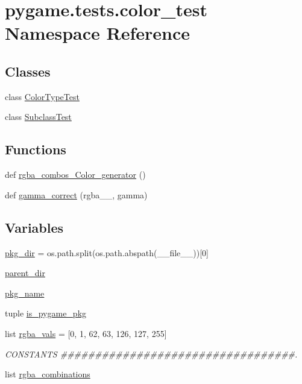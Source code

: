\hypertarget{namespacepygame_1_1tests_1_1color__test}{}\section{pygame.\+tests.\+color\+\_\+test Namespace Reference}
\label{namespacepygame_1_1tests_1_1color__test}
\subsection*{Classes}
\begin{DoxyCompactItemize}
\item 
class \hyperlink{classpygame_1_1tests_1_1color__test_1_1_color_type_test}{Color\+Type\+Test}
\item 
class \hyperlink{classpygame_1_1tests_1_1color__test_1_1_subclass_test}{Subclass\+Test}
\end{DoxyCompactItemize}
\subsection*{Functions}
\begin{DoxyCompactItemize}
\item 
def \hyperlink{namespacepygame_1_1tests_1_1color__test_ae56af93dcf53c5dbac59c44f497d4a95}{rgba\+\_\+combos\+\_\+\+Color\+\_\+generator} ()
\item 
def \hyperlink{namespacepygame_1_1tests_1_1color__test_aeed0e9a3562f78173ef5b03d5e38e4c7}{gamma\+\_\+correct} (rgba\+\_\+\_, gamma)
\end{DoxyCompactItemize}
\subsection*{Variables}
\begin{DoxyCompactItemize}
\item 
\hyperlink{namespacepygame_1_1tests_1_1color__test_af79487905aa8cafa2dfcba3ce7af440d}{pkg\+\_\+dir} = os.\+path.\+split(os.\+path.\+abspath(\+\_\+\+\_\+file\+\_\+\+\_\+))\mbox{[}0\mbox{]}
\item 
\hyperlink{namespacepygame_1_1tests_1_1color__test_a2efc6cc26014c72d84f6729816109569}{parent\+\_\+dir}
\item 
\hyperlink{namespacepygame_1_1tests_1_1color__test_a501f6f43bf8b80e7fa35c7ad8b2a11d3}{pkg\+\_\+name}
\item 
tuple \hyperlink{namespacepygame_1_1tests_1_1color__test_a2a0481fbfad3ecee8c3ee7db586e7341}{is\+\_\+pygame\+\_\+pkg}
\item 
list \hyperlink{namespacepygame_1_1tests_1_1color__test_aded5e3c877289f8fe140ddc4215c1e7d}{rgba\+\_\+vals} = \mbox{[}0, 1, 62, 63, 126, 127, 255\mbox{]}
\begin{DoxyCompactList}\small\item\em C\+O\+N\+S\+T\+A\+N\+TS \#\#\#\#\#\#\#\#\#\#\#\#\#\#\#\#\#\#\#\#\#\#\#\#\#\#\#\#\#\#\#\#\#\#. \end{DoxyCompactList}\item 
list \hyperlink{namespacepygame_1_1tests_1_1color__test_a9d12bc87bd890c7aefa68ef25fe1dace}{rgba\+\_\+combinations}
\end{DoxyCompactItemize}


